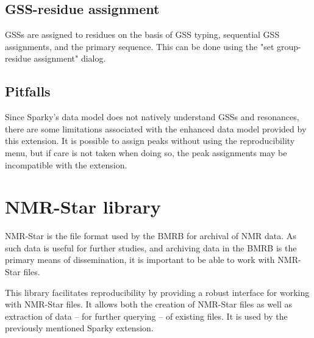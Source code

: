 \subsection{GSS-residue assignment}
GSSs are assigned to residues on the basis of GSS typing, sequential GSS
assignments, and the primary sequence.
This can be done using the "set group-residue assignment" dialog.

\subsection{Pitfalls}
Since Sparky's data model does not natively understand GSSs and resonances,
there are some limitations associated with the enhanced data model provided
by this extension.  It is possible to assign peaks without using the 
reproducibility menu, but if care is not taken when doing so, the peak
assignments may be incompatible with the extension.



\section{NMR-Star library}
NMR-Star is the file format used by the BMRB \cite{bmrb} for archival of
NMR data.  As such data is useful for further studies, and archiving
data in the BMRB is the primary means of dissemination, it is important
to be able to work with NMR-Star files.

This library facilitates reproducibility by providing a robust interface
for working with NMR-Star files.  It allows both the creation of NMR-Star 
files as well as extraction of data -- for further querying -- of existing
files.  It is used by the previously mentioned Sparky extension.

